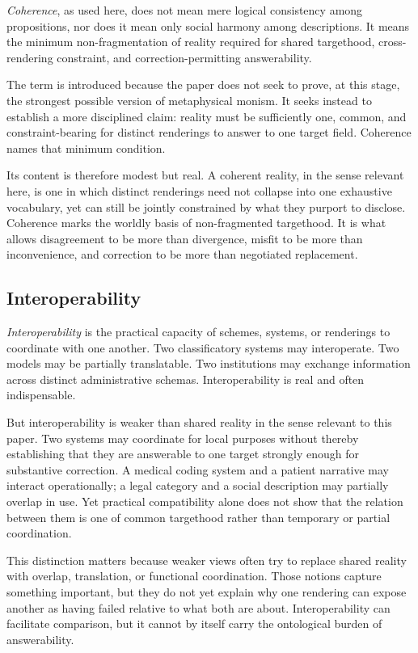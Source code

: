 \documentclass[11pt]{article}
\renewcommand{\emph}[1]{\textit{#1}}
\begin{document}
\emph{Coherence}, as used here, does not mean mere logical consistency among propositions, nor does it mean only social harmony among descriptions. It means the minimum non-fragmentation of reality required for shared targethood, cross-rendering constraint, and correction-permitting answerability.

The term is introduced because the paper does not seek to prove, at this stage, the strongest possible version of metaphysical monism. It seeks instead to establish a more disciplined claim: reality must be sufficiently one, common, and constraint-bearing for distinct renderings to answer to one target field. Coherence names that minimum condition.

Its content is therefore modest but real. A coherent reality, in the sense relevant here, is one in which distinct renderings need not collapse into one exhaustive vocabulary, yet can still be jointly constrained by what they purport to disclose. Coherence marks the worldly basis of non-fragmented targethood. It is what allows disagreement to be more than divergence, misfit to be more than inconvenience, and correction to be more than negotiated replacement.

\subsection{Interoperability}

\emph{Interoperability} is the practical capacity of schemes, systems, or renderings to coordinate with one another. Two classificatory systems may interoperate. Two models may be partially translatable. Two institutions may exchange information across distinct administrative schemas. Interoperability is real and often indispensable.

But interoperability is weaker than shared reality in the sense relevant to this paper. Two systems may coordinate for local purposes without thereby establishing that they are answerable to one target strongly enough for substantive correction. A medical coding system and a patient narrative may interact operationally; a legal category and a social description may partially overlap in use. Yet practical compatibility alone does not show that the relation between them is one of common targethood rather than temporary or partial coordination.

This distinction matters because weaker views often try to replace shared reality with overlap, translation, or functional coordination. Those notions capture something important, but they do not yet explain why one rendering can expose another as having failed relative to what both are about. Interoperability can facilitate comparison, but it cannot by itself carry the ontological burden of answerability.
\end{document}
